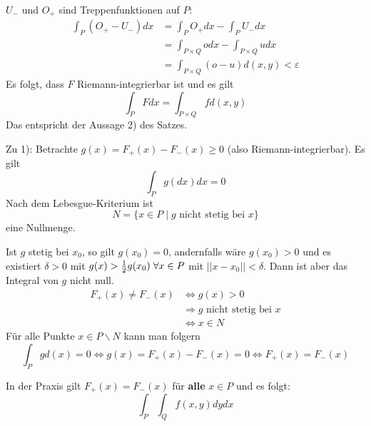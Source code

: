 \documentclass[main.tex]{subfiles}
\begin{document}
\begin{Beweis}
  $U_-$ und $O_+$ sind Treppenfunktionen auf $P$:
  $$\begin{aligned}
    \int_P (O_+ - U_-) dx & = \int_P O_+ dx - \int_P U_- dx \\
    & = \int_{P \times Q} o dx - \int_{P \times Q} u dx \\
    & = \int_{P \times Q} (o-u)d(x,y) < \varepsilon
  \end{aligned}$$
  Es folgt, dass $F$ Riemann-integrierbar ist und es gilt
  $$\int_P F dx = \int_{P \times Q} f d(x,y)$$
  Das entspricht der Aussage 2) des Satzes.

  Zu 1): Betrachte $g(x) = F_+(x) - F_-(x) \geq 0$ (also Riemann-integrierbar). Es gilt
  $$\int_P g(dx)dx = 0$$
  Nach dem Lebesgue-Kriterium ist
  $$N = \{x \in P \mid g \text{ nicht stetig bei } x\}$$
  eine Nullmenge.

  Ist $g$ stetig bei $x_0$, so gilt $g(x_0) = 0$, andernfalls wäre $g(x_0) > 0$ und es existiert $\delta > 0$ mit $g(x) > \frac{1}{2}g(x_0) \;\forall x \in P$ mit $||x-x_0||< \delta$. Dann ist aber das Integral von $g$ nicht null.
  $$\begin{aligned}
    F_+(x) \neq F_-(x) & \Leftrightarrow g(x) > 0 \\
    & \Rightarrow g \text{ nicht stetig bei }x \\
    & \Leftrightarrow x \in N
  \end{aligned}$$
  Für alle Punkte $x \in P \backslash N$ kann man folgern
  $$\int_P g d(x) = 0 \Leftrightarrow g(x) = F_+(x) - F_-(x) = 0 \Leftrightarrow F_+(x) = F_-(x)$$
\end{Beweis}

In der Praxis gilt $F_+(x) = F_-(x)$ für \textbf{alle} $x \in P$ und es folgt:
$$\int_P \int_Q f(x,y)dydx$$
\end{document}
